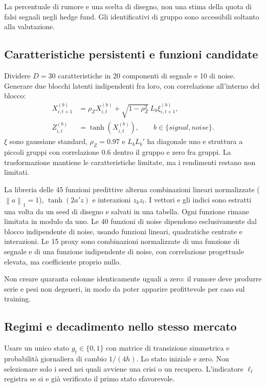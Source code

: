 \documentclass[11pt,a4paper]{article}
\theoremstyle{definition}\newtheorem{definition}[theorem]{Definizione}
\theoremstyle{remark}\newtheorem{remark}[theorem]{Osservazione}
\newcommand{\norm}[1]{\left\lVert#1\right\rVert}\newcommand{\abs}[1]{\left|#1\right|}
\begin{document}
La percentuale di rumore e una scelta di disegno, non una stima della quota di falsi segnali negli hedge fund. Gli identificativi di gruppo sono accessibili soltanto alla valutazione.

\subsection{Caratteristiche persistenti e funzioni candidate}
Dividere $D=30$ caratteristiche in 20 componenti di segnale e 10 di noise. Generare due blocchi latenti indipendenti fra loro, con correlazione all'interno del blocco:
\begin{align}
 X_{i,t+1}^{(b)}&=\rho_Z X_{i,t}^{(b)}+\sqrt{1-\rho_Z^2}\,L_b\xi_{i,t+1}^{(b)},\\
 Z_{i,t}^{(b)}&=\tanh(X_{i,t}^{(b)}),\qquad b\in\{signal,noise\}.
\end{align}
$\xi$ sono gaussiane standard, $\rho_Z=0.97$ e $L_bL_b'$ ha diagonale uno e struttura a piccoli gruppi con correlazione 0.6 dentro il gruppo e zero fra gruppi. La trasformazione mantiene le caratteristiche limitate, ma i rendimenti restano non limitati.

La libreria delle 45 funzioni predittive alterna combinazioni lineari normalizzate ($\norm{a}_1=1$), $\tanh(2a'z)$ e interazioni $z_kz_l$. I vettori e gli indici sono estratti una volta da un seed di disegno e salvati in una tabella. Ogni funzione rimane limitata in modulo da uno. Le 40 funzioni di noise dipendono esclusivamente dal blocco indipendente di noise, usando funzioni lineari, quadratiche centrate e interazioni. Le 15 proxy sono combinazioni normalizzate di una funzione di segnale e di una funzione indipendente di noise, con correlazione progettuale elevata, ma coefficiente proprio nullo.

Non creare quaranta colonne identicamente uguali a zero: il rumore deve produrre serie e pesi non degeneri, in modo da poter apparire profittevole per caso sul training.

\subsection{Regimi e decadimento nello stesso mercato}
Usare un unico stato $g_t\in\{0,1\}$ con matrice di transizione simmetrica e probabilità giornaliera di cambio $1/(4h)$. Lo stato iniziale e zero. Non selezionare solo i seed nei quali avviene una crisi o un recupero. L'indicatore $\ell_t$ registra se si e già verificato il primo stato sfavorevole.
\end{document}

